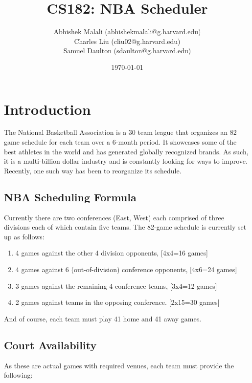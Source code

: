 \documentclass{article}
\begin{document}
	\title{CS182: NBA Scheduler}
	\author{Abhishek Malali (abhishekmalali@g.harvard.edu)\\
			Charles Liu (cliu02@g.harvard.edu)\\
			Samuel Daulton (sdaulton@g.harvard.edu)}
	\date{\today}
	\maketitle
	
	\section{Introduction}
	
	The National Basketball Association is a 30 team league that organizes an 82 game schedule for each team over a 6-month period. It showcases some of the best athletes in the world and has generated globally recognized brands. As such, it is a multi-billion dollar industry and is constantly looking for ways to improve. Recently, one such way has been to reorganize its schedule.
	
	\subsection{NBA Scheduling Formula}

	Currently there are two conferences (East, West) each comprised of three divisions each of which contain five teams. The 82-game schedule is currently set up as follows:

	\begin{enumerate}
		\item 4 games against the other 4 division opponents, [4x4=16 games]
		\item 4 games against 6 (out-of-division) conference opponents, [4x6=24 games]
		\item 3 games against the remaining 4 conference teams, [3x4=12 games]
		\item 2 games against teams in the opposing conference. [2x15=30 games]
	\end{enumerate}

	And of course, each team must play 41 home and 41 away games. 
	
	\subsection{Court Availability}

	As these are actual games with required venues, each team must provide the following:
\end{document}
